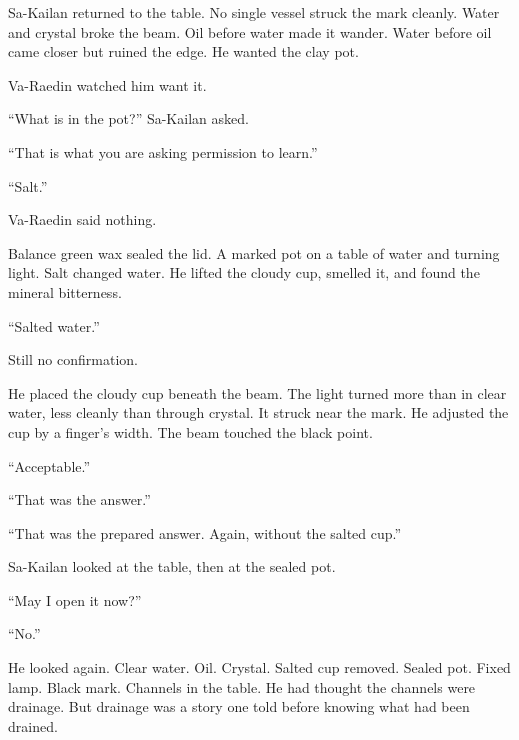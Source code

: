 Sa-Kailan returned to the table.
No single vessel struck the mark cleanly.
Water and crystal broke the beam.
Oil before water made it wander.
Water before oil came closer but ruined the edge.
He wanted the clay pot.\par

Va-Raedin watched him want it.\par

“What is in the pot?” Sa-Kailan asked.\par

“That is what you are asking permission to learn.”\par

“Salt.”\par

Va-Raedin said nothing.\par

Balance green wax sealed the lid.
A marked pot on a table of water and turning light.
Salt changed water.
He lifted the cloudy cup, smelled it, and found the mineral bitterness.\par

“Salted water.”\par

Still no confirmation.\par

He placed the cloudy cup beneath the beam.
The light turned more than in clear water, less cleanly than through crystal.
It struck near the mark.
He adjusted the cup by a finger’s width.
The beam touched the black point.\par

“Acceptable.”\par

“That was the answer.”\par

“That was the prepared answer.
Again, without the salted cup.”\par

Sa-Kailan looked at the table, then at the sealed pot.\par

“May I open it now?”\par

“No.”\par

He looked again.
Clear water.
Oil.
Crystal.
Salted cup removed.
Sealed pot.
Fixed lamp.
Black mark.
Channels in the table.
He had thought the channels were drainage.
But drainage was a story one told before knowing what had been drained.\par

